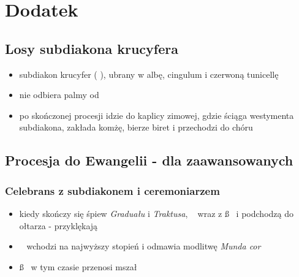 \section{Dodatek}
\label{sec:dodatek_palm}

\subsection{Losy subdiakona krucyfera}
\begin{itemize}
      \item subdiakon krucyfer (  ), ubrany w albę, cingulum i czerwoną
            tunicellę
      \item nie odbiera palmy od \ii
      \item po skończonej procesji idzie do kaplicy zimowej, gdzie ściąga westymenta
            subdiakona, zakłada komżę, bierze biret i przechodzi do chóru
\end{itemize}

\subsection{Procesja do Ewangelii - dla zaawansowanych}

\subsubsection*{\textbf{Celebrans z subdiakonem i ceremoniarzem }}
\begin{itemize}
      \item kiedy skończy się śpiew \textit{Graduału} i \textit{Traktusa}, \ii~ wraz
            z \ss~ i  podchodzą do ołtarza - przyklękają
      \item \ii~ wchodzi na najwyższy stopień i odmawia modlitwę \textit{Munda cor}
      \item \ss~ w tym czasie przenosi mszał
\end{itemize}

